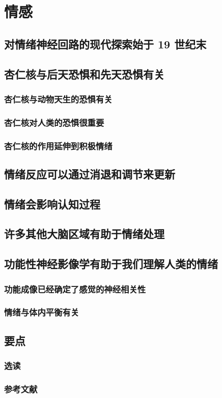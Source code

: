\chapter{情感}


\section{对情绪神经回路的现代探索始于 19 世纪末}

\section{杏仁核与后天恐惧和先天恐惧有关}
\subsection{杏仁核与动物天生的恐惧有关}
\subsection{杏仁核对人类的恐惧很重要}
\subsection{杏仁核的作用延伸到积极情绪}

\section{情绪反应可以通过消退和调节来更新}

\section{情绪会影响认知过程}

\section{许多其他大脑区域有助于情绪处理}

\section{功能性神经影像学有助于我们理解人类的情绪}
\subsection{功能成像已经确定了感觉的神经相关性}
\subsection{情绪与体内平衡有关}

\section{要点}
\subsection{选读}
\subsection{参考文献}
